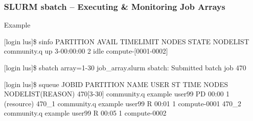 \begin{frame}[fragile]
\frametitle{SLURM sbatch -- Executing \& Monitoring Job Arrays}\footnotesize
\begin{block}{Example}
\begin{semiverbatim}\tiny
[login lus]\$ sinfo
PARTITION     AVAIL  TIMELIMIT  NODES  STATE NODELIST
community.q   up     3-00:00:00 2      idle  compute-[0001-0002]

[login lus]\$ sbatch {\ddash}array=1-30 job_array.slurm
sbatch: Submitted batch job 470

[login lus]\$ squeue
JOBID      PARTITION    NAME     USER    ST   TIME    NODES  NODELIST(REASON)
470[3-30]  community.q  example  user99  PD   00:00   1      (resource)
470_1      community.q  example  user99  R    00:01   1      compute-0001
470_2      community.q  example  user99  R    00:05   1      compute-0002
\end{semiverbatim}
\end{block}
\end{frame}
